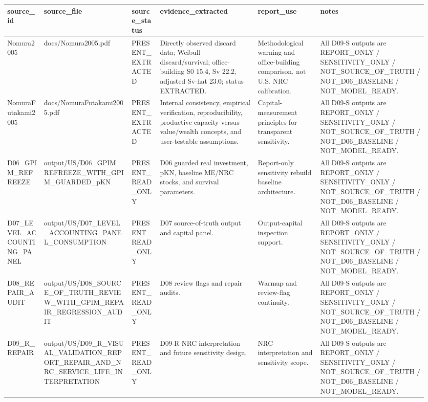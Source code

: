 
\begin{tabular}{llllll}
\toprule
source\_id & source\_file & source\_status & evidence\_extracted & report\_use & notes\\
\midrule
Nomura2005 & docs/Nomura2005.pdf & PRESENT\_EXTRACTED & Directly observed discard data; Weibull discard/survival; office-building S0 15.4, Sv 22.2, adjusted Sv-hat 23.0; status EXTRACTED. & Methodological warning and office-building comparison, not U.S. NRC calibration. & All D09-S outputs are REPORT\_ONLY / SENSITIVITY\_ONLY / NOT\_SOURCE\_OF\_TRUTH / NOT\_D06\_BASELINE / NOT\_MODEL\_READY.\\
NomuraFutakami2005 & docs/NomuraFutakami2005.pdf & PRESENT\_EXTRACTED & Internal consistency, empirical verification, reproducibility, productive capacity versus value/wealth concepts, and user-testable assumptions. & Capital-measurement principles for transparent sensitivity. & All D09-S outputs are REPORT\_ONLY / SENSITIVITY\_ONLY / NOT\_SOURCE\_OF\_TRUTH / NOT\_D06\_BASELINE / NOT\_MODEL\_READY.\\
D06\_GPIM\_REFREEZE & output/US/D06\_GPIM\_REFREEZE\_WITH\_GPIM\_GUARDED\_pKN & PRESENT\_READ\_ONLY & D06 guarded real investment, pKN, baseline ME/NRC stocks, and survival parameters. & Report-only sensitivity rebuild baseline architecture. & All D09-S outputs are REPORT\_ONLY / SENSITIVITY\_ONLY / NOT\_SOURCE\_OF\_TRUTH / NOT\_D06\_BASELINE / NOT\_MODEL\_READY.\\
D07\_LEVEL\_ACCOUNTING\_PANEL & output/US/D07\_LEVEL\_ACCOUNTING\_PANEL\_CONSUMPTION & PRESENT\_READ\_ONLY & D07 source-of-truth output and capital panel. & Output-capital inspection support. & All D09-S outputs are REPORT\_ONLY / SENSITIVITY\_ONLY / NOT\_SOURCE\_OF\_TRUTH / NOT\_D06\_BASELINE / NOT\_MODEL\_READY.\\
D08\_REPAIR\_AUDIT & output/US/D08\_SOURCE\_OF\_TRUTH\_REVIEW\_WITH\_GPIM\_REPAIR\_REGRESSION\_AUDIT & PRESENT\_READ\_ONLY & D08 review flags and repair audits. & Warmup and review-flag continuity. & All D09-S outputs are REPORT\_ONLY / SENSITIVITY\_ONLY / NOT\_SOURCE\_OF\_TRUTH / NOT\_D06\_BASELINE / NOT\_MODEL\_READY.\\
\addlinespace
D09\_R\_REPAIR & output/US/D09\_R\_VISUAL\_VALIDATION\_REPORT\_REPAIR\_AND\_NRC\_SERVICE\_LIFE\_INTERPRETATION & PRESENT\_READ\_ONLY & D09-R NRC interpretation and future sensitivity design. & NRC interpretation and sensitivity scope. & All D09-S outputs are REPORT\_ONLY / SENSITIVITY\_ONLY / NOT\_SOURCE\_OF\_TRUTH / NOT\_D06\_BASELINE / NOT\_MODEL\_READY.\\
\bottomrule
\end{tabular}
